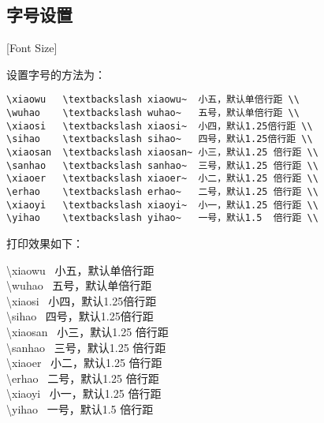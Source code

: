 \subsection{字号设置}[Font Size]

设置字号的方法为：
\begin{lstlisting}
\xiaowu   \textbackslash xiaowu~  小五，默认单倍行距 \\
\wuhao    \textbackslash wuhao~   五号，默认单倍行距 \\
\xiaosi   \textbackslash xiaosi~  小四，默认1.25倍行距 \\
\sihao    \textbackslash sihao~   四号，默认1.25倍行距 \\
\xiaosan  \textbackslash xiaosan~ 小三，默认1.25 倍行距 \\
\sanhao   \textbackslash sanhao~  三号，默认1.25 倍行距 \\
\xiaoer   \textbackslash xiaoer~  小二，默认1.25 倍行距 \\
\erhao    \textbackslash erhao~   二号，默认1.25 倍行距 \\
\xiaoyi   \textbackslash xiaoyi~  小一，默认1.25 倍行距 \\
\yihao    \textbackslash yihao~   一号，默认1.5  倍行距 \\
\end{lstlisting}

打印效果如下：

\begin{flushleft}
  {
    \xiaowu   \textbackslash xiaowu~  小五，默认单倍行距 \\
    \wuhao    \textbackslash wuhao~   五号，默认单倍行距 \\
    \xiaosi   \textbackslash xiaosi~  小四，默认1.25倍行距 \\
    \sihao    \textbackslash sihao~   四号，默认1.25倍行距 \\
    \xiaosan  \textbackslash xiaosan~ 小三，默认1.25 倍行距 \\
    \sanhao   \textbackslash sanhao~  三号，默认1.25 倍行距 \\
    \xiaoer   \textbackslash xiaoer~  小二，默认1.25 倍行距 \\
    \erhao    \textbackslash erhao~   二号，默认1.25 倍行距 \\
    \xiaoyi   \textbackslash xiaoyi~  小一，默认1.25 倍行距 \\
    \yihao    \textbackslash yihao~   一号，默认1.5  倍行距 \\
  }
\end{flushleft}

